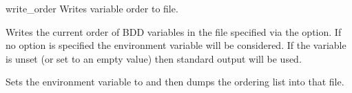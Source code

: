\begin{nusmvCommand} {write\_order} {Writes variable order to file.}


Writes the current order of BDD variables in the file specified via
the  option. If no option is specified the environment
variable  will be considered. If the
variable  is unset (or set to an empty
value) then standard output will be used.

\begin{cmdOpt}

 {Sets the environment variable
 to  and then dumps the
ordering list into that file.}


\end{cmdOpt}
\end{nusmvCommand}

